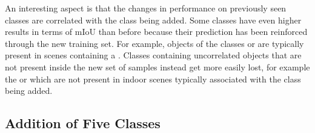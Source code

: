 \documentclass[10pt,twocolumn,letterpaper]{article}
\begin{document}
An interesting aspect is that the changes in performance on previously seen classes are correlated with the class being added. Some classes have even higher results in terms of mIoU than before because their prediction has been reinforced through the new training set. For example, objects of the classes  or  are typically present in scenes containing a . Classes containing uncorrelated objects that are not present inside the new set of samples  instead get more easily lost, for example the  or  which are not present in indoor scenes typically associated  with the  class being added.



\subsection{Addition of Five Classes}
\end{document}
